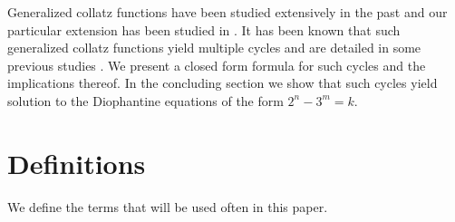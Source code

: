 \documentclass[12pt]{article} %
\begin{document}
Generalized collatz functions have been studied extensively in the past \cite{kurtz2007} and our particular extension has been studied in \cite{john2004} \cite{Hayden} \cite{lagaris90} \cite{Belaga98}. It has been known that such generalized collatz functions yield multiple cycles and are detailed in some previous studies \cite{john2004}. We present a closed form formula for such cycles and the implications thereof. In the concluding section we show that such cycles yield solution to the Diophantine equations of the form $2^n - 3^m = k$. 

\section{Definitions}

We define the terms that will be used often in this paper. 
\end{document}
